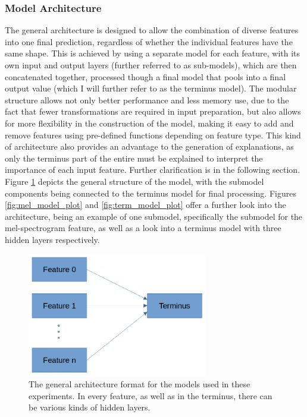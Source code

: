 \documentclass{article}
\begin{document}
			\subsubsection{Model Architecture}
			The general architecture is designed to allow the combination of diverse features into
			one final prediction, regardless of whether the individual features have the same
			shape. This is achieved by using a separate model for each feature, with its own input
			and output layers (further referred to as sub-models), which are then concatenated
			together, processed though a final model that pools into a final output value (which I
			will further refer to as the terminus model). The modular structure allows not only
			better performance and less memory use, due to the fact that fewer transformations are
			required in input preparation, but also allows for more flexibility in the
			construction of the model, making it easy to add and remove features using pre-defined
			functions depending on feature type. This kind of architecture also provides an
			advantage to the generation of explanations, as only the terminus part of the entire
			must be explained to interpret the importance of each input feature. Further
			clarification is in the following section. Figure \ref{fig:model_plot} depicts the
			general structure of the model, with the submodel components being connected to the
			terminus model for final processing. Figures \ref{fig:mel_model_plot} and
			\ref{fig:term_model_plot} offer a further look into the architecture, being an example
			of one submodel, specifically the submodel for the mel-spectrogram feature, as well as
			a look into a terminus model with three hidden layers respectively.
			\begin{figure}[htbp]
				\begin{center}
					\includegraphics[width=0.7\textwidth]{images/model_fig.png}
					\caption{The general architecture format for the models used in these
					experiments. In every feature, as well as in the terminus, there can be
					various kinds of hidden layers.}
					\label{fig:model_plot}
				\end{center}
			\end{figure}
\end{document}

